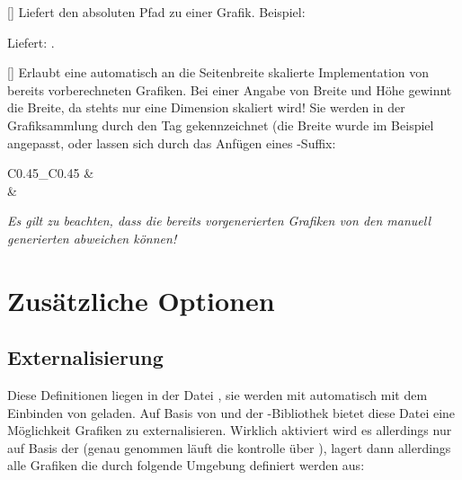 []
Liefert den absoluten Pfad zu einer Grafik. Beispiel:
\begin{latex*}
\end{latex*}
Liefert: .

%
%
%

[]
Erlaubt eine automatisch an die Seitenbreite skalierte Implementation von bereits vorberechneten Grafiken. Bei einer Angabe von Breite und Höhe gewinnt die Breite, da stehts nur eine Dimension skaliert wird! Sie werden in der Grafiksammlung durch den Tag  gekennzeichnet (die Breite wurde im Beispiel angepasst, oder lassen sich durch das Anfügen eines -Suffix:
\begin{center}
    \begin{tabular}{C{0.45\linewidth}_C{0.45\linewidth}}
         &  \\
        {\tiny {}} & {\tiny{}}
    \end{tabular}
\end{center}
\emph{Es gilt zu beachten, dass die bereits vorgenerierten Grafiken von den manuell generierten abweichen können!}


%
%
%
%
%

\section{Zusätzliche Optionen}

%
%
%

\subsection{Externalisierung}
Diese Definitionen liegen in der Datei , sie werden mit  automatisch mit dem Einbinden von  geladen.\medskip\newline
Auf Basis von  und der \TikZ-Bibliothek  bietet diese Datei eine Möglichkeit Grafiken zu externalisieren. Wirklich aktiviert wird es allerdings nur auf Basis der \Jake[-]  (genau genommen läuft die kontrolle über ), lagert dann allerdings alle Grafiken die durch folgende Umgebung definiert werden aus:

